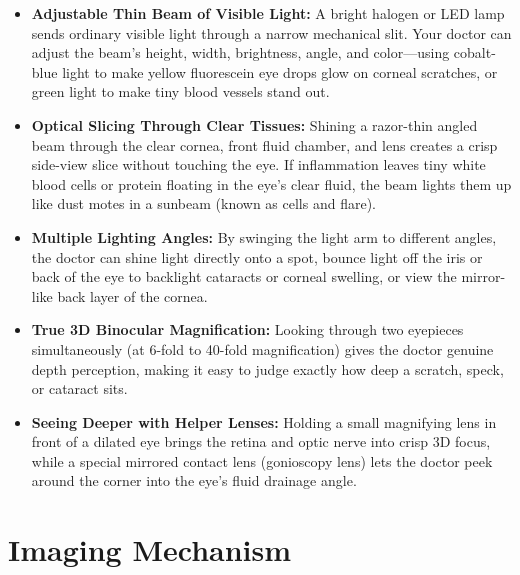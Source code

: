 \begin{itemize}
    \item \textbf{Adjustable Thin Beam of Visible Light:} A bright halogen or LED lamp sends ordinary visible light through a narrow mechanical slit. Your doctor can adjust the beam's height, width, brightness, angle, and color---using cobalt-blue light to make yellow fluorescein eye drops glow on corneal scratches, or green light to make tiny blood vessels stand out.
    \item \textbf{Optical Slicing Through Clear Tissues:} Shining a razor-thin angled beam through the clear cornea, front fluid chamber, and lens creates a crisp side-view slice without touching the eye. If inflammation leaves tiny white blood cells or protein floating in the eye's clear fluid, the beam lights them up like dust motes in a sunbeam (known as cells and flare).
    \item \textbf{Multiple Lighting Angles:} By swinging the light arm to different angles, the doctor can shine light directly onto a spot, bounce light off the iris or back of the eye to backlight cataracts or corneal swelling, or view the mirror-like back layer of the cornea.
    \item \textbf{True 3D Binocular Magnification:} Looking through two eyepieces simultaneously (at 6-fold to 40-fold magnification) gives the doctor genuine depth perception, making it easy to judge exactly how deep a scratch, speck, or cataract sits.
    \item \textbf{Seeing Deeper with Helper Lenses:} Holding a small magnifying lens in front of a dilated eye brings the retina and optic nerve into crisp 3D focus, while a special mirrored contact lens (gonioscopy lens) lets the doctor peek around the corner into the eye's fluid drainage angle.
\end{itemize}

\section{Imaging Mechanism}

